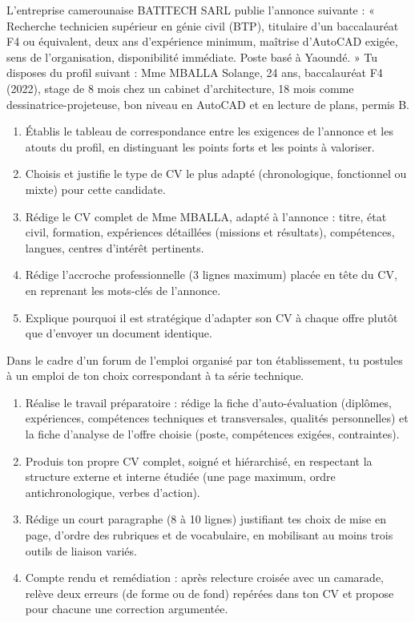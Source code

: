 \documentclass[11pt]{article}
\begin{document}
\begin{exercice}
L'entreprise camerounaise BATITECH SARL publie l'annonce suivante : « Recherche technicien supérieur en génie civil (BTP), titulaire d'un baccalauréat F4 ou équivalent, deux ans d'expérience minimum, maîtrise d'AutoCAD exigée, sens de l'organisation, disponibilité immédiate. Poste basé à Yaoundé. » Tu disposes du profil suivant : Mme MBALLA Solange, 24 ans, baccalauréat F4 (2022), stage de 8 mois chez un cabinet d'architecture, 18 mois comme dessinatrice-projeteuse, bon niveau en AutoCAD et en lecture de plans, permis B.
\begin{enumerate}
\item Établis le tableau de correspondance entre les exigences de l'annonce et les atouts du profil, en distinguant les points forts et les points à valoriser.
\item Choisis et justifie le type de CV le plus adapté (chronologique, fonctionnel ou mixte) pour cette candidate.
\item Rédige le CV complet de Mme MBALLA, adapté à l'annonce : titre, état civil, formation, expériences détaillées (missions et résultats), compétences, langues, centres d'intérêt pertinents.
\item Rédige l'accroche professionnelle (3 lignes maximum) placée en tête du CV, en reprenant les mots-clés de l'annonce.
\item Explique pourquoi il est stratégique d'adapter son CV à chaque offre plutôt que d'envoyer un document identique.
\end{enumerate}
\end{exercice}

\begin{exercice}
Dans le cadre d'un forum de l'emploi organisé par ton établissement, tu postules à un emploi de ton choix correspondant à ta série technique.
\begin{enumerate}
\item Réalise le travail préparatoire : rédige la fiche d'auto-évaluation (diplômes, expériences, compétences techniques et transversales, qualités personnelles) et la fiche d'analyse de l'offre choisie (poste, compétences exigées, contraintes).
\item Produis ton propre CV complet, soigné et hiérarchisé, en respectant la structure externe et interne étudiée (une page maximum, ordre antichronologique, verbes d'action).
\item Rédige un court paragraphe (8 à 10 lignes) justifiant tes choix de mise en page, d'ordre des rubriques et de vocabulaire, en mobilisant au moins trois outils de liaison variés.
\item Compte rendu et remédiation : après relecture croisée avec un camarade, relève deux erreurs (de forme ou de fond) repérées dans ton CV et propose pour chacune une correction argumentée.
\end{enumerate}
\end{exercice}
\end{document}
